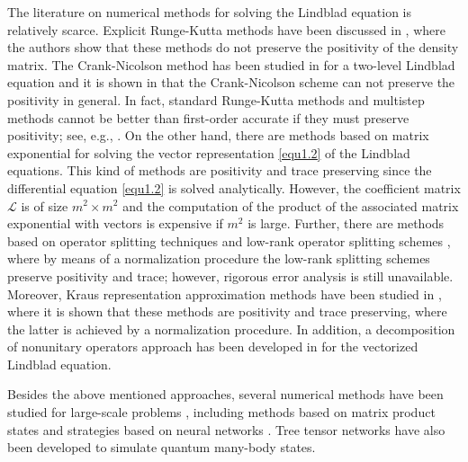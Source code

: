 \documentclass[preprint,3p,compress,12pt]{elsarticle}
\numberwithin{equation}{section}
\numberwithin{figure}{section}
\begin{document}
The literature on numerical methods for solving the Lindblad equation is
relatively scarce. Explicit Runge-Kutta methods have been discussed in \cite{Riesch}, where the authors show that these methods do not preserve the positivity of the density matrix. The Crank-Nicolson method has been studied in \cite{Ziolkowski} for a two-level Lindblad equation and it is shown in \cite{Bidegaray} that the Crank-Nicolson scheme can not preserve the positivity in general. In fact, standard Runge-Kutta methods and multistep methods cannot be better than first-order accurate if they must
preserve positivity; see, e.g., \cite{Blanes2022,Martiradonna2020}. On the other hand, there are methods based on matrix exponential \cite{Riesch,Riesch1,Saut} for solving the vector representation \eqref{equ1.2} of the Lindblad equations. This kind of methods are positivity and trace preserving since the differential equation \eqref{equ1.2} is solved analytically. However, the coefficient matrix $\mathcal{L}$ is of size $m^2\times m^2$ and the computation of the product of the associated matrix exponential with vectors is expensive if $m^2$ is large. Further, there are methods based on operator splitting techniques \cite{Songolo1,Songolo2} and low-rank operator splitting schemes \cite{LeBris1,LeBris2}, where by means of a normalization procedure the low-rank splitting schemes preserve positivity and trace; however, rigorous error analysis is still unavailable. Moreover, Kraus representation approximation methods have been studied in \cite{Cao}, where it is shown that these methods are positivity and trace preserving,
where the latter is achieved by a normalization procedure. In addition, a decomposition of nonunitary operators approach has been developed in \cite{Schlimgen} for the vectorized Lindblad equation.

Besides the above mentioned approaches, several numerical methods have been studied for large-scale problems \cite{Weimer,Werner}, including methods based on matrix product states \cite{Orus,Schollwock,Vidal1,Vidal2} and strategies based on neural networks \cite{Hartmann,Nagy,Reh}. Tree tensor networks \cite{Arceci,Sulz} have also been developed to simulate quantum many-body states.
\end{document}
